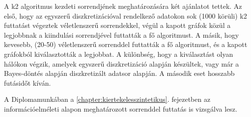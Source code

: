 A k2 algoritmus kezdeti sorrendjének meghatározására két ajánlatot tettek. Az első, hogy az egyszerű diszkretizációval rendelkező adatokon sok (1000 körüli) k2 futtatást végeztek véletlenszerű sorrendekkel, végül a kapott gráfok közül a legjobbnak a kiindulási sorrendjével futtatták a fő algoritmust. A másik, hogy kevesebb, (20-50) véletlenszerű sorrenddel futtatták a fő algoritmust, és a kapott gráfokból kiválasztották a legjobbat. A különbség, hogy a kiválasztást olyan hálókon végzik, amelyek egyszerű diszkretizáció alapján készültek, vagy már a Bayes-döntés alapján diszkretizált adatsor alapján. A második eset hosszabb futásidőt kíván.

A Diplomamunkában a \ref{chapter:kiertekelesszintetikus}. fejezetben az információelméleti alapon meghatározott sorrenddel futtatás is vizsgálva lesz.